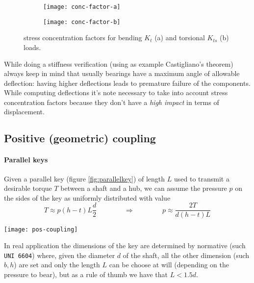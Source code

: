 	\begin{figure}[bht]
		\centering
		\begin{subfigure}{0.48\linewidth}
			\centering \texttt{[image: conc-factor-a]} \caption{}
		\end{subfigure}
		\begin{subfigure}{0.48\linewidth}
			\centering \texttt{[image: conc-factor-b]} \caption{}
		\end{subfigure}
		\caption{stress concentration factors for bending $K_t$ (a) and torsional $K_{ts}$ (b) loads.} 
		\label{fig:stressconcentrationfactors}
	\end{figure}

	While doing a stiffness verification (using as example Castigliano's theorem) always keep in mind that usually bearings have a maximum angle of allowable deflection: having higher deflections leads to premature failure of the components. While computing deflections it's note necessary to take into account stress concentration factors because they don't have a \textit{high impact} in terms of displacement.
	
\subsection{Positive (geometric) coupling}
	
	\paragraph{Parallel keys}Given a parallel key (figure \ref{fig:parallelkey}) of length $L$ used to transmit a desirable torque $T$ between a shaft and a hub, we can assume the pressure $p$ on the sides of the key as uniformly distributed with value \[T \approx p(h-t) L \frac d 2\qquad \qquad \Rightarrow \qquad \qquad p \approx \frac{2T}{d(h-t)L}\]
	
	\begin{SCfigure}[2][bht]
		\centering \texttt{[image: pos-coupling]} 
		\caption{schematic representation of a geometric coupling made by a parallel key.} \label{fig:parallelkey}
	\end{SCfigure}
	
	In real application the dimensions of the key are determined by normative (such \texttt{UNI 6604}) where, given the diameter $d$ of the shaft, all the other dimension (such $b,h$) are set and only the length $L$ can be choose at will (depending on the pressure to bear), but as a rule of thumb we have that $L <1.5d$.
	
